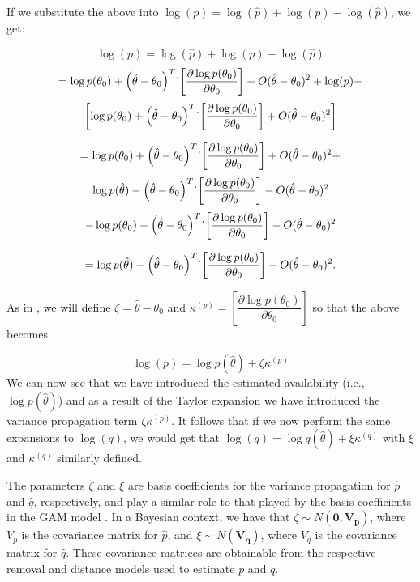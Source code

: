 \documentclass[12pt]{article}
\begin{document}
If we substitute the above into $\log(p) = \log(\hat{p}) + \log(p) - \log(\hat{p})$, we get:

$$	\log(p)  = \log(\hat{p}) + \log(p) - \log(\hat{p}) $$
$$ = \log p(\theta_0) + \left( \hat{\theta} - \theta_0 \right)^T \dot \\ \left[ \dfrac{\partial \log p({\theta_0})}{\partial {\theta_0}}  \right] + O(\hat{\theta} - \theta_0)^2 + \log(p) - $$
$$ \left[ \log p(\theta_0) + \left( \hat{\theta} - \theta_0 \right)^T \dot \\ \left[ \dfrac{\partial \log p({\theta_0})}{\partial {\theta_0}}  \right] + O(\hat{\theta} - \theta_0)^2  \right] $$

$$ = \log p(\theta_0) + \left( \hat{\theta} - \theta_0 \right)^T \dot \\ \left[ \dfrac{\partial \log p({\theta_0})}{\partial {\theta_0}}  \right] + O(\hat{\theta} - \theta_0)^2 + $$
$$\log p(\hat{\theta}) - \left( \hat{\theta} - \theta_0 \right)^T \dot \\ \left[ \dfrac{\partial \log p({\theta_0})}{\partial {\theta_0}}  \right] - O(\hat{\theta} - \theta_0)^2 $$
$$ - \log p(\theta_0) - \left( \hat{\theta} - \theta_0 \right)^T \dot \\ \left[ \dfrac{\partial \log p({\theta_0})}{\partial {\theta_0}}  \right] - O(\hat{\theta} - \theta_0)^2  $$

$$ = \log p(\hat{\theta}) - \left( \hat{\theta} - \theta_0 \right)^T \dot \\ \left[ \dfrac{\partial \log p({\theta_0})}{\partial {\theta_0}}  \right] - O(\hat{\theta} - \theta_0)^2. $$

As in \citet{bravington_variance_2021}, we will define $\zeta = \hat{\theta} - \theta_0$ and $\kappa^{(p)} = \left[ \dfrac{\partial \log p({\theta_0})}{\partial {\theta_0}}  \right]$ so that the above becomes

$$\log(p) = \log p(\hat{\theta}) + \zeta\kappa^{(p)}$$
We can now see that we have introduced the estimated availability (i.e., $\log p(\hat{\theta})$) and as a result of the Taylor expansion we have introduced the variance propagation term $\zeta\kappa^{(p)}$.
It follows that if we now perform the same expansions to $\log(q)$, we would get that $\log(q) = \log q(\hat{\theta}) + \xi\kappa^{(q)}$ with $\xi$ and $\kappa^{(q)}$ similarly defined.

\par The parameters $\zeta$ and $\xi$ are basis coefficients for the variance propagation for $\hat{p}$ and $\hat{q}$, respectively, and play a similar role to that played by the basis coefficients in the GAM model \citep{bravington_variance_2021}. 
In a Bayesian context, we have that $\zeta \sim N(\boldsymbol{0}, \boldsymbol{V_p})$, where $V_p$ is the covariance matrix for $\hat{p}$, and $\xi \sim N(\boldsymbol{V_q})$, where $V_q$ is the covariance matrix for $\hat{q}$.
These covariance matrices are obtainable from the respective removal and distance models used to estimate $p$ and $q$.
\end{document}

